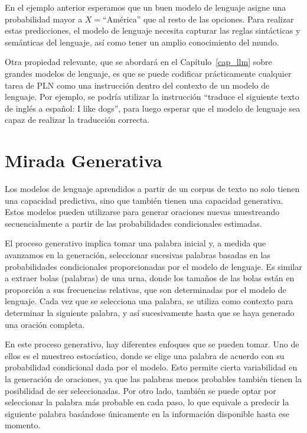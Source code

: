 En el ejemplo anterior esperamos que un buen modelo de lenguaje asigne una probabilidad mayor a $X=$``América'' que al resto de las opciones. Para realizar estas predicciones, el modelo de lenguaje necesita capturar las reglas sintácticas y semánticas del lenguaje, así como tener un amplio conocimiento del mundo. 


Otra propiedad relevante, que se abordará en el Capítulo~\ref{cap_llm} sobre grandes modelos de lenguaje, es que se puede codificar prácticamente cualquier tarea de PLN como una instrucción dentro del contexto de un modelo de lenguaje. Por ejemplo, se podría utilizar la instrucción ``traduce el siguiente texto de inglés a español: I like dogs'', para luego esperar que el modelo de lenguaje sea capaz de realizar la traducción correcta.

\section{Mirada Generativa}

Los modelos de lenguaje aprendidos a partir de un corpus de texto no solo tienen una capacidad predictiva, sino que también tienen una capacidad generativa. Estos modelos pueden utilizarse para generar oraciones nuevas muestreando secuencialmente a partir de las probabilidades condicionales estimadas.

El proceso generativo implica tomar una palabra inicial y, a medida que avanzamos en la generación, seleccionar sucesivas palabras basadas en las probabilidades condicionales proporcionadas por el modelo de lenguaje. Es similar a extraer bolas (palabras) de una urna, donde los tamaños de las bolas están en proporción a sus frecuencias relativas, que son determinadas por el modelo de lenguaje. Cada vez que se selecciona una palabra, se utiliza como contexto para determinar la siguiente palabra, y así sucesivamente hasta que se haya generado una oración completa.

En este proceso generativo, hay diferentes enfoques que se pueden tomar. Uno de ellos es el muestreo estocástico, donde se elige una palabra de acuerdo con su probabilidad condicional dada por el modelo. Esto permite cierta variabilidad en la generación de oraciones, ya que las palabras menos probables también tienen la posibilidad de ser seleccionadas. Por otro lado, también se puede optar por seleccionar la palabra más probable en cada paso, lo que equivale a predecir la siguiente palabra basándose únicamente en la información disponible hasta ese momento. 


